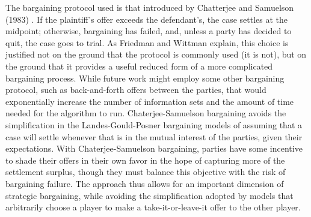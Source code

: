 \documentclass{article}
\begin{document}
The bargaining protocol used is that introduced by Chatterjee and Samuelson (1983) \cite{chatterjeesamuelson}. If the plaintiff's offer exceeds the defendant's, the case settles at the midpoint; otherwise, bargaining has failed, and, unless a party has decided to quit, the case goes to trial. As Friedman and Wittman \cite{friedmanwittman} explain, this choice is justified not on the ground that the protocol is commonly used (it is not), but on the ground that it provides a useful reduced form of a more complicated bargaining process. While future work might employ some other bargaining protocol, such as back-and-forth offers between the parties, that would exponentially increase the number of information sets and the amount of time needed for the algorithm to run. Chaterjee-Samuelson bargaining avoids the simplification in the Landes-Gould-Posner bargaining models of assuming that a case will settle whenever that is in the mutual interest of the parties, given their expectations. With Chaterjee-Samuelson bargaining, parties have some incentive to shade their offers in their own favor in the hope of capturing more of the settlement surplus, though they must balance this objective with the risk of bargaining failure. The approach thus allows for an important dimension of strategic bargaining, while avoiding the simplification adopted by models that arbitrarily choose a player to make a take-it-or-leave-it offer to the other player.
\end{document}
